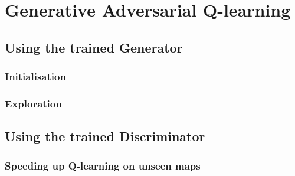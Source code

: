
\chapter{Generative Adversarial Q-learning} %

\label{Chapter6}


\section{Using the trained Generator}
\subsection{Initialisation}
\subsection{Exploration}


\section{Using the trained Discriminator}
\subsection{Speeding up Q-learning on unseen maps}


